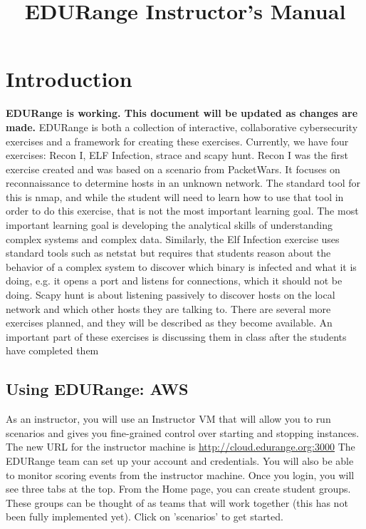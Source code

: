 \documentclass[11pt]{report}
\begin{document}
\title{EDURange Instructor's Manual}
\maketitle

%  
\section{Introduction}
\label{sec:intro}
{\bf  EDURange is working.  This document will be updated as changes are made.}
EDURange is both a collection of interactive, collaborative cybersecurity exercises and a framework 
for creating these exercises.  Currently, we have four exercises:  Recon I, ELF Infection, strace and scapy hunt.
Recon I was the first exercise created and was based on a scenario from PacketWars.  It
focuses on reconnaissance to determine hosts in an unknown network.  The standard tool for this is 
nmap, and while the student will need to learn how to use that tool in order to do this exercise, 
that is
not the most important learning goal. The most important learning goal is developing the
analytical skills of understanding complex systems and complex data.  Similarly, the Elf Infection 
exercise uses standard tools such as netstat but requires that students
reason about the behavior of a complex system to discover which binary is infected and 
what it is doing, e.g.
it opens a port and listens for connections, which it should not be doing.  
Scapy hunt is about listening passively to discover hosts on the local network and 
which other hosts they are talking to.
There are several more exercises planned, and they will be described as they become available.
An important part of these exercises is discussing them in class after the students have 
completed them



\subsection{Using EDURange: AWS}
As an instructor, you will use an Instructor VM that will allow you to run scenarios
and gives you fine-grained control over starting and stopping instances.
The new URL for the instructor machine is \url{http://cloud.edurange.org:3000}
The EDURange team can set up your account and credentials.
You will also be able to monitor scoring events from the instructor machine.
Once you login, you will see three tabs at the top.  From the Home page,
you can create student groups.  These groups can be thought of as teams that will work
together (this has not been fully implemented yet).  
Click on 'scenarios' to get started.
\end{document}
